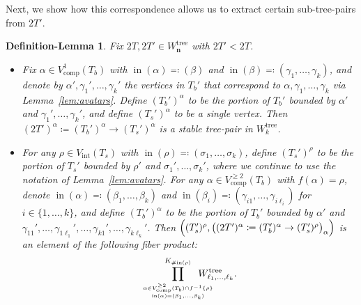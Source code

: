 \documentclass[11pt]{amsart}
\newtheorem{deflem}[theorem]{Definition-Lemma}
\theoremstyle{definition}
\theoremstyle{remark}
\theoremstyle{plain}
\newcommand\bn{\mathbf{n}}
\newcommand{\on}{\operatorname}
\newcommand{\comp}{C^2}
\renewcommand{\comp}{{\on{comp}}}
\newcommand{\incom}{\on{in}}
\newcommand{\inte}{{\on{int}}}
\newcommand{\tree}{{\on{tree}}}
\begin{document}
Next, we show how this correspondence allows us to extract certain sub-tree-pairs from $2T'$.

\begin{deflem}
\label{deflem:subtreepairs}
Fix $2T, 2T' \in W_\bn^\tree$ with $2T' < 2T$.
\begin{itemize}
\item[(a)] Fix $\alpha \in V_\comp^1(T_b)$ with $\incom(\alpha) \eqqcolon (\beta)$ and $\incom(\beta) \eqqcolon (\gamma_1,\ldots,\gamma_k)$, and denote by $\alpha', \gamma_1', \ldots, \gamma_k'$ the vertices in $T_b'$ that correspond to $\alpha,\gamma_1,\ldots,\gamma_k$ via Lemma~\ref{lem:avatars}.
Define $(T_b')^\alpha$ to be the portion of $T_b'$ bounded by $\alpha'$ and $\gamma_1',\ldots,\gamma_k'$, and define $(T_s')^\alpha$ to be a single vertex.
Then $(2T')^\alpha\coloneqq (T_b')^\alpha \to (T_s')^\alpha$ is a stable tree-pair in $W_k^\tree$.

\item[(b)] For any $\rho \in V_\inte(T_s)$ with $\incom(\rho) \eqqcolon (\sigma_1,\ldots,\sigma_k)$, define $(T_s')^\rho$ to be the portion of $T_s'$ bounded by $\rho'$ and $\sigma_1',\ldots,\sigma_k'$, where we continue to use the notation of Lemma~\ref{lem:avatars}.
For any $\alpha \in V_\comp^{\geq2}(T_b)$ with $f(\alpha) = \rho$, denote $\incom(\alpha) \eqqcolon (\beta_1,\ldots,\beta_k)$ and $\incom(\beta_i) \eqqcolon (\gamma_{i1},\ldots,\gamma_{i\ell_i})$ for $i \in \{1,\ldots,k\}$, and define $(T_b')^\alpha$ to be the portion of $T_b'$ bounded by $\alpha'$ and $\gamma_{11}',\ldots,\gamma_{1\ell_1}',\ldots,\gamma_{k1}',\ldots,\gamma_{k\ell_k}'$.
Then $\Bigl((T_s')^\rho, \bigl((2T')^\alpha\coloneqq (T_b')^\alpha \to (T_s')^\rho\bigr)_\alpha\Bigr)$ is an element of the following fiber product:
\begin{align}
\prod^{K_{\#\!\incom(\rho)}}_{
{\alpha\in V_\comp^{\geq2}(T_b)\cap f^{-1}\{\rho\}}
\atop
{\incom(\alpha)=(\beta_1,\ldots,\beta_k)}
}
\hspace{-0.25in} W^\tree_{\ell_1,\ldots,\ell_k}.
\end{align}
\end{itemize}
\end{deflem}
\end{document}
